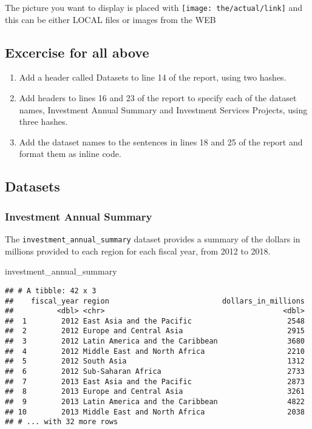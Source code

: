 \documentclass[
]{article}
\newenvironment{Shaded}{\begin{snugshade}}{\end{snugshade}}
\newcommand{\NormalTok}[1]{#1}
\providecommand{\tightlist}{%
  \setlength{\itemsep}{0pt}\setlength{\parskip}{0pt}}
\begin{document}
The picture you want to display is placed with
\texttt{[image: the/actual/link]} and this can be either LOCAL files or
images from the WEB

\hypertarget{excercise-for-all-above}{%
\subsection{Excercise for all above}\label{excercise-for-all-above}}

\begin{enumerate}
\def\labelenumi{\arabic{enumi}.}
\tightlist
\item
  Add a header called Datasets to line 14 of the report, using two
  hashes.
\item
  Add headers to lines 16 and 23 of the report to specify each of the
  dataset names, Investment Annual Summary and Investment Services
  Projects, using three hashes.
\item
  Add the dataset names to the sentences in lines 18 and 25 of the
  report and format them as inline code.
\end{enumerate}

\hypertarget{datasets}{%
\subsection{Datasets}\label{datasets}}

\hypertarget{investment-annual-summary}{%
\subsubsection{Investment Annual
Summary}\label{investment-annual-summary}}

The \texttt{investment\_annual\_summary} dataset provides a summary of
the dollars in millions provided to each region for each fiscal year,
from 2012 to 2018.

\begin{Shaded}
\begin{Highlighting}[]
\NormalTok{investment\_annual\_summary}
\end{Highlighting}
\end{Shaded}

\begin{verbatim}
## # A tibble: 42 x 3
##    fiscal_year region                          dollars_in_millions
##          <dbl> <chr>                                         <dbl>
##  1        2012 East Asia and the Pacific                      2548
##  2        2012 Europe and Central Asia                        2915
##  3        2012 Latin America and the Caribbean                3680
##  4        2012 Middle East and North Africa                   2210
##  5        2012 South Asia                                     1312
##  6        2012 Sub-Saharan Africa                             2733
##  7        2013 East Asia and the Pacific                      2873
##  8        2013 Europe and Central Asia                        3261
##  9        2013 Latin America and the Caribbean                4822
## 10        2013 Middle East and North Africa                   2038
## # ... with 32 more rows
\end{verbatim}
\end{document}
